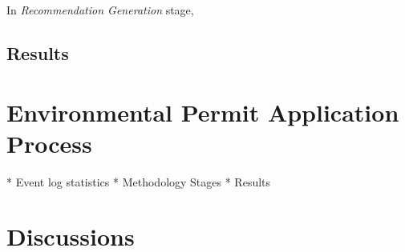 In \textit{Recommendation Generation} stage, 


\subsection{Results}
\label{sec:loan-app-results}

\section{Environmental Permit Application Process}
\label{sec:environmental-permit-application-process}
 
* Event log statistics
* Methodology Stages
* Results

\section{Discussions}
\label{sec:discussions}